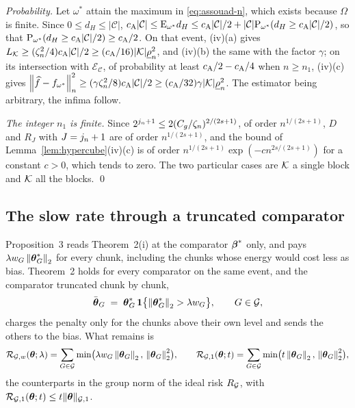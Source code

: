 \emph{Probability.} Let $\omega^{*}$ attain the maximum in
\eqref{eq:assouad-n}, which exists because $\Omega$ is finite. Since
$0 \le d_{H} \le |\mathcal{C}|$,
$c_{\mathrm{A}}|\mathcal{C}| \le \mathrm{E}_{\omega^{*}}d_{H} \le c_{\mathrm{A}}|\mathcal{C}|/2 +
|\mathcal{C}|\mathrm{P}_{\omega^{*}}(d_{H} \ge c_{\mathrm{A}}|\mathcal{C}|/2)$, so that
$\mathrm{P}_{\omega^{*}}(d_{H} \ge c_{\mathrm{A}}|\mathcal{C}|/2) \ge c_{\mathrm{A}}/2$. On that event,
(iv)(a) gives $L_{\mathcal{K}} \ge (\zeta_n^{2}/4)c_{\mathrm{A}}|\mathcal{C}|/2 \ge
(c_{\mathrm{A}}/16)|\mathcal{K}|\underline{\rho}_{n}^{2}$, and (iv)(b) the same with the factor $\gamma$; on
its intersection with $\mathcal{E}_{\mathcal{C}}$, of probability at least
$c_{\mathrm{A}}/2 - c_{\mathrm{A}}/4$ when $n \ge n_{1}$, (iv)(c) gives
$\left\lVert \widehat{f}-f_{\omega^{*}} \right\rVert_{n}^{2} \ge
(\gamma\zeta_n^{2}/8)c_{\mathrm{A}}|\mathcal{C}|/2 \ge (c_{\mathrm{A}}/32)\gamma|\mathcal{K}|\underline{\rho}_{n}^{2}$.
The estimator being arbitrary, the infima follow.

\emph{The integer $n_{1}$ is finite.} Since $2^{j_n+1} \le
2(C_g/\zeta_n)^{2/(2s+1)}$, of order $n^{1/(2s+1)}$, $D$ and $R_J$ with
$J = j_n + 1$ are of order $n^{1/(2s+1)}$, and the bound of
Lemma~\ref{lem:hypercube}(iv)(c) is of order
$n^{1/(2s+1)}\exp(-cn^{2s/(2s+1)})$ for a constant $c > 0$, which tends to
zero. The two particular cases are $\mathcal{K}$ a single block and $\mathcal{K}$ all the
blocks. \qed

\subsection*{The slow rate through a truncated comparator}

Proposition~3 reads Theorem~2(i) at the comparator $\boldsymbol{\beta}^{*}$ only, and pays
$\lambda w_{G}\left\lVert \boldsymbol{\theta}^{*}_{G} \right\rVert_{2}$ for every chunk, including the chunks
whose energy would cost less as bias. Theorem~2 holds for every comparator on
the same event, and the comparator truncated chunk by chunk,
\begin{equation}
  \label{eq:truncated-blocks}
  \bar{\boldsymbol{\theta}}_{G} \;=\; \boldsymbol{\theta}^{*}_{G}\,\mathbf{1}\bigl\{\left\lVert \boldsymbol{\theta}^{*}_{G} \right\rVert_{2}
  > \lambda w_{G}\bigr\},
  \qquad G \in \mathcal{G},
\end{equation}
charges the penalty only for the chunks above their own level and sends the
others to the bias. What remains is
\begin{equation}
  \label{eq:RG}
  \mathcal{R}_{\mathcal{G},w}(\boldsymbol{\theta};\lambda) = \sum_{G\in\mathcal{G}}
  \min\bigl(\lambda w_{G}\left\lVert \boldsymbol{\theta}_{G} \right\rVert_{2},\,\left\lVert \boldsymbol{\theta}_{G} \right\rVert_{2}^{2}\bigr),
  \qquad
  \mathcal{R}_{\mathcal{G},1}(\boldsymbol{\theta};t) = \sum_{G\in\mathcal{G}}
  \min\bigl(t\left\lVert \boldsymbol{\theta}_{G} \right\rVert_{2},\,\left\lVert \boldsymbol{\theta}_{G} \right\rVert_{2}^{2}\bigr),
\end{equation}
the counterparts in the group norm of the ideal risk $R_{\mathcal{G}}$, with
$\mathcal{R}_{\mathcal{G},1}(\boldsymbol{\theta};t) \le t\lVert \boldsymbol{\theta}\rVert_{\mathcal{G},1}$.

